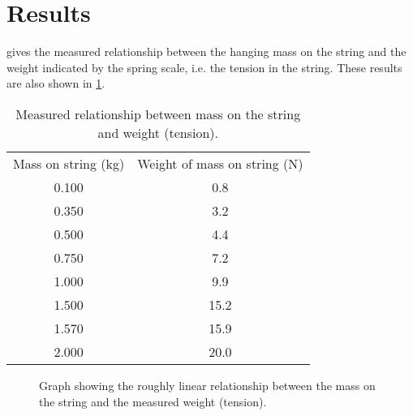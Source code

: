 \documentclass[reprint,amsmath,amssymb,aps]{revtex4-2}
\begin{document}
    
\section{Results}
       
 gives the measured relationship between the hanging mass on the string and the weight indicated by the spring scale, i.e. the tension in the string. These results are also shown in \cref{fig:mass_tension_graph}. 

\begin{table}
\caption{\label{tab:table1} Measured relationship between mass on the string and weight (tension).}
\begin{center}
\begin{ruledtabular}
\begin{tabular}{cc}
Mass on string (\unit{\kilo\gram}) & Weight of mass on string (\unit{\newton}) \\
\colrule
0.100   &   0.8  \\
0.350   &   3.2  \\
0.500   &   4.4  \\
0.750   &   7.2  \\
1.000  &   9.9  \\
1.500  &   15.2 \\
1.570  &   15.9 \\
2.000  &   20.0 \\
\end{tabular}
\end{ruledtabular}
\end{center}
\end{table}
        
\begin{figure}
\begin{center}
\end{center}
\caption{\label{fig:mass_tension_graph} Graph showing the roughly linear relationship between the mass on the string and the measured weight (tension).}
\end{figure}
\end{document}
